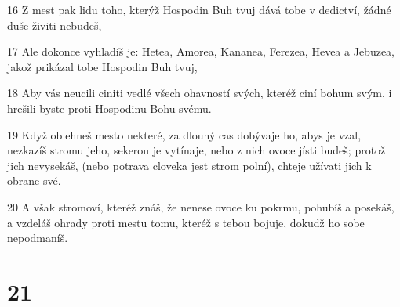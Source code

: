 \par 16 Z mest pak lidu toho, kterýž Hospodin Buh tvuj dává tobe v dedictví, žádné duše živiti nebudeš,
\par 17 Ale dokonce vyhladíš je: Hetea, Amorea, Kananea, Ferezea, Hevea a Jebuzea, jakož prikázal tobe Hospodin Buh tvuj,
\par 18 Aby vás neucili ciniti vedlé všech ohavností svých, kteréž ciní bohum svým, i hrešili byste proti Hospodinu Bohu svému.
\par 19 Když oblehneš mesto nekteré, za dlouhý cas dobývaje ho, abys je vzal, nezkazíš stromu jeho, sekerou je vytínaje, nebo z nich ovoce jísti budeš; protož jich nevysekáš, (nebo potrava cloveka jest strom polní), chteje užívati jich k obrane své.
\par 20 A však stromoví, kteréž znáš, že nenese ovoce ku pokrmu, pohubíš a posekáš, a vzdeláš ohrady proti mestu tomu, kteréž s tebou bojuje, dokudž ho sobe nepodmaníš.

\chapter{21}

